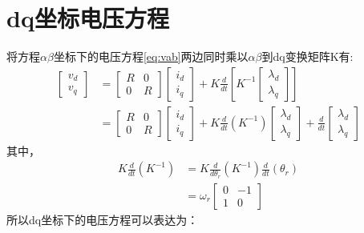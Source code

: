 \section{dq坐标电压方程}
将方程$\alpha\beta$坐标下的电压方程\ref{eq:vab}两边同时乘以$\alpha\beta$到dq变换矩阵K有:
\begin{align}\label{eq:vdq}
\begin{bmatrix}
v_{d}\\v_{q}
\end{bmatrix}
&=
\begin{bmatrix}
R&0\\0&R
\end{bmatrix}
\begin{bmatrix}
i_{d}\\i_{q}
\end{bmatrix}
+
K\frac{d}{dt}\left[K^{-1}\begin{bmatrix}
\lambda_{d}\\\lambda_{q}\end{bmatrix}\right]\nonumber\\
&=\begin{bmatrix}
R&0\\0&R
\end{bmatrix}
\begin{bmatrix}
i_{d}\\i_{q}\end{bmatrix}+K\frac{d}{dt}\left(K^{-1}\right)\begin{bmatrix}
\lambda_{d}\\\lambda_{q}\end{bmatrix}+\frac{d}{dt}\begin{bmatrix}\lambda_{d}\\\lambda_{q}\end{bmatrix}
\end{align}
其中，
\begin{align}\label{eq:trans}
K\frac{d}{dt}\left(K^{-1}\right)&=K\frac{d}{d\theta_{r}}\left(K^{-1}\right)\frac{d}{dt}\left(\theta_{r}\right)\nonumber\\
&=\omega_{r}\begin{bmatrix}0&-1\\1&0\end{bmatrix}
\end{align}
所以dq坐标下的电压方程可以表达为：
